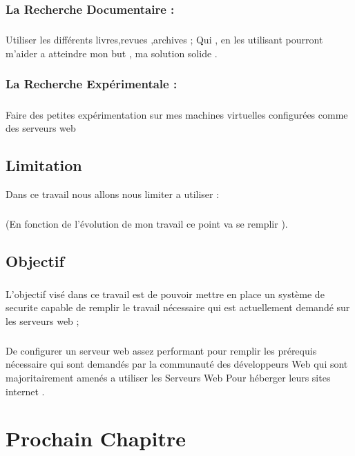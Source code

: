 \documentclass{report}
\begin{document}
    \subsection{La Recherche Documentaire :}
    \paragraph{ }
    Utiliser les différents livres,revues ,archives ;
    Qui , en les utilisant pourront m'aider a atteindre mon but , ma solution solide .
  \subsection{ La Recherche Expérimentale :}
  \paragraph{ }
  Faire des petites expérimentation sur mes machines virtuelles configurées comme des serveurs web  
  \section{Limitation}
  Dans ce travail nous allons nous limiter a utiliser :
  \paragraph{ } (En fonction de l’évolution de mon travail ce point va se remplir ).
  \section{Objectif}
  
  \paragraph{ }L'objectif visé  dans ce travail est de pouvoir mettre en place un système de securite capable de remplir le travail nécessaire qui est actuellement demandé  sur les serveurs web ;
  \paragraph{ } De configurer un serveur web assez performant pour remplir les prérequis    nécessaire qui sont demandés par la communauté  des développeurs   Web qui sont majoritairement amenés a utiliser les Serveurs Web Pour héberger leurs sites internet  .
  
   \chapter{Prochain Chapitre}
    
\end{document}
